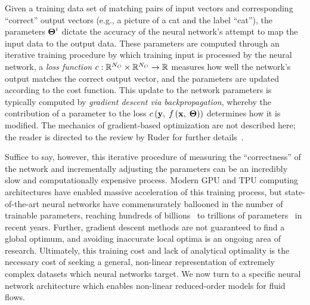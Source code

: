 Given a training data set of matching pairs of input vectors and corresponding ``correct'' output vectors (e.g., a picture of a cat and the label ``cat''), the parameters $\boldsymbol{\Theta}^{i}$ dictate the accuracy of the neural network's attempt to map the input data to the output data. These parameters are computed through an iterative training procedure by which training input is processed by the neural network, a \textit{loss function} $c: \mathbb{R}^{N_{O}} \times \mathbb{R}^{N_{O}} \rightarrow \mathbb{R}$ measures how well the network's output matches the correct output vector, and the parameters are updated according to the cost function. This update to the network parameters is typically computed by \textit{gradient descent via backpropagation}, whereby the contribution of a parameter to the loss $c\left(\mathbf{y}, \; f\left({\mathbf{x}, \; \boldsymbol{\Theta}}\right)\right)$ determines how it is modified. The mechanics of gradient-based optimization are not described here; the reader is directed to the review by Ruder for further details~\cite{Ruder2016}.

Suffice to say, however, this iterative procedure of measuring the ``correctness'' of the network and incrementally adjusting the parameters can be an incredibly slow and computationally expensive process. Modern GPU and TPU computing architectures have enabled massive acceleration of this training process, but state-of-the-art neural networks have commensurately ballooned in the number of trainable parameters, reaching hundreds of billions~\cite{Brown2020} to trillions of parameters~\cite{Fedus2022} in recent years. Further, gradient descent methods are not guaranteed to find a global optimum, and avoiding inaccurate local optima is an ongoing area of research. Ultimately, this training cost and lack of analytical optimality is the necessary cost of seeking a general, non-linear representation of extremely complex datasets which neural networks target. We now turn to a specific neural network architecture which enables non-linear reduced-order models for fluid flows.

